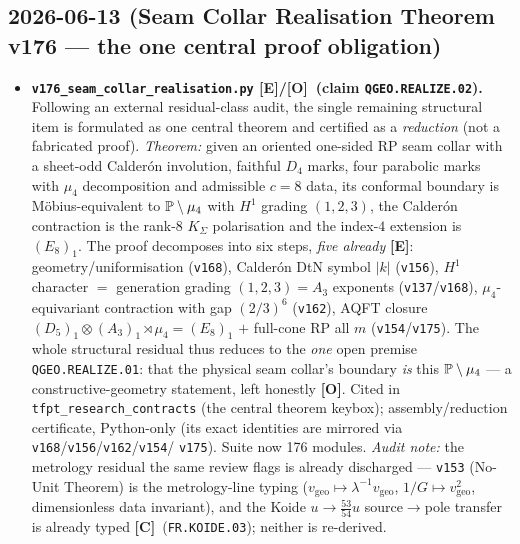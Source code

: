\documentclass[11pt]{article}
\providecommand{\mE}{\textbf{[E]}}\providecommand{\mC}{\textbf{[C]}}
\providecommand{\mO}{\textbf{[O]}}\providecommand{\mX}{\textbf{[X]}}
\providecommand{\vref}[1]{\texttt{#1}}
\begin{document}
\subsection*{2026-06-13 (Seam Collar Realisation Theorem v176 --- the one central proof obligation)}
\begin{itemize}
\item \textbf{\texttt{v176\_seam\_collar\_realisation.py} \mE/\mO\ (claim \texttt{QGEO.REALIZE.02}).}
  Following an external residual-class audit, the single remaining structural item is formulated as
  one central theorem and certified as a \emph{reduction} (not a fabricated proof). \emph{Theorem:}
  given an oriented one-sided RP seam collar with a sheet-odd Calder\'on involution, faithful $D_4$
  marks, four parabolic marks with $\mu_4$ decomposition and admissible $c{=}8$ data, its conformal
  boundary is M\"obius-equivalent to $\mathbb{P}\setminus\mu_4$ with $H^1$ grading $(1,2,3)$, the Calder\'on
  contraction is the rank-$8$ $K_\Sigma$ polarisation and the index-$4$ extension is $(E_8)_1$. The
  proof decomposes into six steps, \emph{five already} \mE: geometry/uniformisation (\vref{v168}),
  Calder\'on DtN symbol $|k|$ (\vref{v156}), $H^1$ character $=$ generation grading
  $(1,2,3)=A_3$ exponents (\vref{v137}/\vref{v168}), $\mu_4$-equivariant contraction with gap
  $(2/3)^6$ (\vref{v162}), AQFT closure $(D_5)_1{\otimes}(A_3)_1{\rtimes}\mu_4=(E_8)_1$ $+$ full-cone
  RP all $m$ (\vref{v154}/\vref{v175}). The whole structural residual thus reduces to the \emph{one}
  open premise \texttt{QGEO.REALIZE.01}: that the physical seam collar's boundary \emph{is} this
  $\mathbb{P}\setminus\mu_4$ --- a constructive-geometry statement, left honestly \mO. Cited in
  \texttt{tfpt\_research\_contracts} (the central theorem keybox); assembly/reduction certificate,
  Python-only (its exact identities are mirrored via \vref{v168}/\vref{v156}/\vref{v162}/\vref{v154}/%
  \vref{v175}). Suite now 176 modules. \emph{Audit note:} the metrology residual the same review
  flags is already discharged --- \vref{v153} (No-Unit Theorem) is the metrology-line typing
  ($v_{\mathrm{geo}}\mapsto\lambda^{-1}v_{\mathrm{geo}}$, $1/G\mapsto v_{\mathrm{geo}}^2$,
  dimensionless data invariant), and the Koide $u\to\tfrac{53}{54}u$ source$\to$pole transfer is
  already typed \mC\ (\texttt{FR.KOIDE.03}); neither is re-derived.
\end{itemize}
\end{document}
